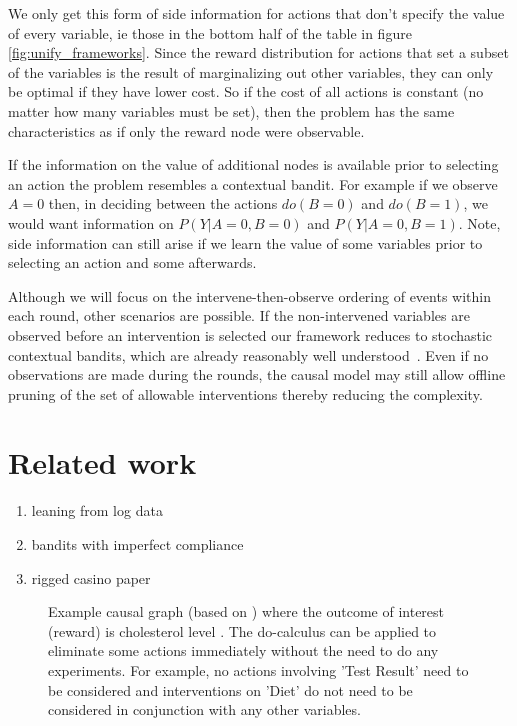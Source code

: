 \documentclass[11pt,a4paper,oneside]{book}
\begin{document}
We only get this form of side information for actions that don't specify the value of every variable, ie those in the bottom half of the table in figure \ref{fig:unify_frameworks}. Since the reward distribution for actions that set a subset of the variables is the result of marginalizing out other variables, they can only be optimal if they have lower cost. So if the cost of all actions is constant (no matter how many variables must be set), then the problem has the same characteristics as if only the reward node were observable.

If the information on the value of additional nodes is available prior to selecting an action the problem resembles a contextual bandit. For example if we observe $A = 0$ then, in deciding between the actions $do(B=0)$ and $do(B=1)$, we would want information on $P(Y|A=0,B=0)$ and $P(Y|A=0,B=1)$.  Note, side information can still arise if we learn the value of some variables prior to selecting an action and some afterwards. 

Although we will focus on the intervene-then-observe ordering of events within each round, other scenarios are possible. If the non-intervened variables are observed before an intervention is selected our framework reduces to stochastic contextual bandits, which are already reasonably well understood~\citep{Agarwal2014}. Even if no observations are made during the rounds, the causal model may still allow offline pruning of the set of allowable interventions thereby reducing the complexity.


\section*{Related work}
\begin{enumerate}
\item leaning from log data
\item bandits with imperfect compliance
\item rigged casino paper
\end{enumerate}

\begin{figure}[h]
\caption{Example causal graph (based on \cite{Koller2009}) where the outcome of interest (reward) is cholesterol level . The do-calculus can be applied to eliminate some actions immediately without the need to do any experiments. For example, no actions involving 'Test Result' need to be considered and interventions on 'Diet' do not need to be considered in conjunction with any other variables.}
\label{fig:cholesterol_graph}
\centering
{}
\end{figure}
\end{document}
